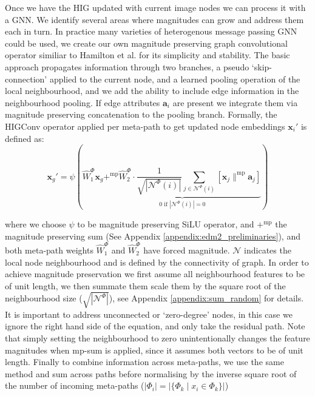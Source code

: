 Once we have the HIG updated with current image nodes we can process it with a GNN. We identify several areas where magnitudes can grow and address them each in turn. In practice many varieties of heterogenous message passing GNN could be used, we create our own magnitude preserving graph convolutional operator similiar to Hamilton et al. \cite{hamilton_inductive_2018} for its simplicity and stability. The basic approach propagates information through two branches, a pseudo `skip-connection' applied to the current node, and a learned pooling operation of the local neighbourhood, and we add the ability to include edge information in the neighbourhood pooling. If edge attributes $\mathbf{a}_i$ are present we integrate them via magnitude preserving concatenation to the pooling branch. Formally, the HIGConv operator applied per meta-path to get updated node embeddings $\mathbf{x}_i'$ is defined as:
\begin{equation}
    \mathbf{x}_g' = \psi\left(\hat{W}^{\Phi}_1 \mathbf{x}_g 
    \underset{0 \text{ if } |\mathcal{N}^{\Phi}(i)| = 0}{\underbrace{+^\text{mp} \hat{W}^{\Phi}_2 \cdot \frac{1}{\sqrt{|\mathcal{N}^{\Phi}(i)|}} \sum_{j \in \mathcal{N}^{\Phi}(i)} [\mathbf{x}_j \|^\text{mp} \mathbf{a}_j]}}\right)    \label{eq:hignn_operator}
\end{equation}


where we choose $\psi$ to be magnitude preserving SiLU operator, and $+^\text{mp}$ the magnitude preserving sum (See Appendix \ref{appendix:edm2_preliminaries}), and both meta-path weights $\hat{W}^{\Phi}_1$ and $\hat{W}^{\Phi}_2$ have forced magnitude. $\mathcal{N}$ indicates the local node neighbourhood and is defined by the connectivity of graph. In order to achieve magnitude preservation we first assume all neighbourhood features to be of unit length, we then summate them scale them by the square root of the neighbourhood size ($\sqrt{|\mathcal{N}^{\Phi}|}$), see Appendix \ref{appendix:sum_random} for details. It is important to address unconnected or `zero-degree' nodes, in this case we ignore the right hand side of the equation, and only take the residual path. Note that simply setting the  neighbourhood to zero unintentionally changes the feature magnitudes when mp-sum is applied, since it assumes both vectors to be of unit length. Finally to combine information across meta-paths, we use the same method and sum across paths before normalising by the inverse square root of the number of incoming meta-paths ($|\Phi_i| = |\{\Phi_k \mid x_i \in \Phi_k\}|$)

